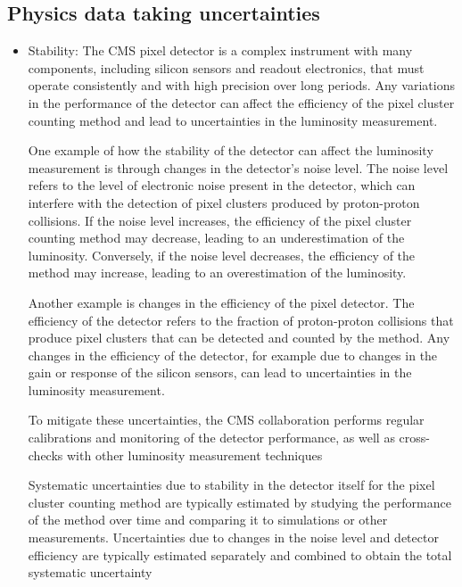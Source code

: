 \subsection{Physics data taking uncertainties}

\begin{itemize}

\item Stability: The CMS pixel detector is a complex instrument with many components, including silicon sensors and readout electronics, that must operate consistently and with high precision over long periods. Any variations in the performance of the detector can affect the efficiency of the pixel cluster counting method and lead to uncertainties in the luminosity measurement.

  One example of how the stability of the detector can affect the luminosity measurement is through changes in the detector's noise level. The noise level refers to the level of electronic noise present in the detector, which can interfere with the detection of pixel clusters produced by proton-proton collisions. If the noise level increases, the efficiency of the pixel cluster counting method may decrease, leading to an underestimation of the luminosity. Conversely, if the noise level decreases, the efficiency of the method may increase, leading to an overestimation of the luminosity.

  Another example is changes in the efficiency of the pixel detector. The efficiency of the detector refers to the fraction of proton-proton collisions that produce pixel clusters that can be detected and counted by the method. Any changes in the efficiency of the detector, for example due to changes in the gain or response of the silicon sensors, can lead to uncertainties in the luminosity measurement.

  To mitigate these uncertainties, the CMS collaboration performs regular calibrations and monitoring of the detector performance, as well as cross-checks with other luminosity measurement techniques

  Systematic uncertainties due to stability in the detector itself for the pixel cluster counting method are typically estimated by studying the performance of the method over time and comparing it to simulations or other measurements. Uncertainties due to changes in the noise level and detector efficiency are typically estimated separately and combined to obtain the total systematic uncertainty




\end{itemize}
